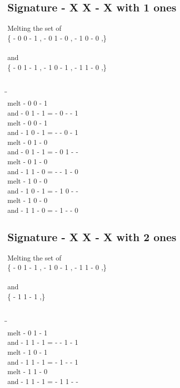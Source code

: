 \documentclass{article}
\begin{document}
\subsection{Signature - X X - X with 1 ones}
Melting the set of\\
\{ -  0  0  -  1 , -  0  1  -  0 , -  1  0  -  0 ,\}\\\\
and\\
\{ -  0  1  -  1 , -  1  0  -  1 , -  1  1  -  0 ,\}\\\\
\begin{tabbing}
\hspace{3cm}\=\hspace{3cm}\=\hspace{3cm}\\[1cm]
melt\> -  0  0  -  1 \\
and\> -  0  1  -  1 \>
 =  -  0  -  -  1 \\[1mm]
melt\> -  0  0  -  1 \\
and\> -  1  0  -  1 \>
 =  -  -  0  -  1 \\[1mm]
melt\> -  0  1  -  0 \\
and\> -  0  1  -  1 \>
 =  -  0  1  -  - \\[1mm]
melt\> -  0  1  -  0 \\
and\> -  1  1  -  0 \>
 =  -  -  1  -  0 \\[1mm]
melt\> -  1  0  -  0 \\
and\> -  1  0  -  1 \>
 =  -  1  0  -  - \\[1mm]
melt\> -  1  0  -  0 \\
and\> -  1  1  -  0 \>
 =  -  1  -  -  0 \\[1mm]
\end{tabbing}
\newpage
\subsection{Signature - X X - X with 2 ones}
Melting the set of\\
\{ -  0  1  -  1 , -  1  0  -  1 , -  1  1  -  0 ,\}\\\\
and\\
\{ -  1  1  -  1 ,\}\\\\
\begin{tabbing}
\hspace{3cm}\=\hspace{3cm}\=\hspace{3cm}\\[1cm]
melt\> -  0  1  -  1 \\
and\> -  1  1  -  1 \>
 =  -  -  1  -  1 \\[1mm]
melt\> -  1  0  -  1 \\
and\> -  1  1  -  1 \>
 =  -  1  -  -  1 \\[1mm]
melt\> -  1  1  -  0 \\
and\> -  1  1  -  1 \>
 =  -  1  1  -  - \\[1mm]
\end{tabbing}
\newpage
\end{document}
